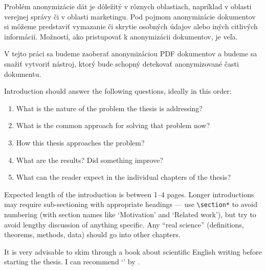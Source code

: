 

Problém anonymizácie dát je dôležitý v rôznych oblastiach, napríklad v oblasti verejnej správy či
v oblasti marketingu. Pod pojmom anonymizácie dokumentov si môžeme predstaviť vymazanie či skrytie osobných údajov 
alebo iných citlivých informácií. Možností, ako pristupovať k anonymizácii dokumentov, je veľa. 

V tejto práci sa budeme zaoberať anonymizáciou PDF dokumentov a budeme sa snažiť vytvoriť nástroj, ktorý bude schopný
detekovať anonymizované časti dokumentu.   
\newline

Introduction should answer the following questions, ideally in this order:
\begin{enumerate}
\item What is the nature of the problem the thesis is addressing?
\item What is the common approach for solving that problem now?
\item How this thesis approaches the problem?
\item What are the results? Did something improve?
\item What can the reader expect in the individual chapters of the thesis?
\end{enumerate}

Expected length of the introduction is between 1--4 pages. Longer introductions may require sub-sectioning with appropriate headings --- use \texttt{\textbackslash{}section*} to avoid numbering (with section names like `Motivation' and `Related work'), but try to avoid lengthy discussion of anything specific. Any ``real science'' (definitions, theorems, methods, data) should go into other chapters.

It is very advisable to skim through a book about scientific English writing before starting the thesis. I can recommend `' by \citet{glasman2010science}.
